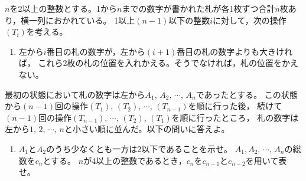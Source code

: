 \documentclass[../../main.tex]{subfiles}
\begin{document}
$n$を2以上の整数とする。1から$n$までの数字が書かれた札が各1枚ずつ合計$n$枚あり，横一列におかれている。
1以上$(n-1)$以下の整数$i$に対して，次の操作$(T_i)$を考える。
\begin{enumerate}
  \item[($T_i$)]左から$i$番目の札の数字が，左から$(i+1)$番目の札の数字よりも大きければ，
    これら2枚の札の位置を入れかえる。そうでなければ，札の位置をかえない。
\end{enumerate}
最初の状態において札の数字は左から$A_1, \, A_2, \, \cdots, \, A_n$であったとする。
この状態から$(n-1)$回の操作$(T_1), \, (T_2), \, \cdots, \, (T_{n-1})$を順に行った後，
続けて$(n-1)$回の操作$(T_{n-1}), \, \cdots, \, (T_2), \, (T_1)$を順に行ったところ，
札の数字は左から$1, \, 2, \, \cdots, \, n$と小さい順に並んだ。以下の問いに答えよ。
\begin{enumerate}
  \item$A_1$と$A_2$のうち少なくとも一方は2以下であることを示せ。
  $A_1, A_2, \, \cdots, \, A_n$の総数を$c_n$とする。
    $n$が4以上の整数であるとき，$c_n$を$c_{n-1}$と$c_{n-2}$を用いて表せ。
\end{enumerate}
\end{document}
